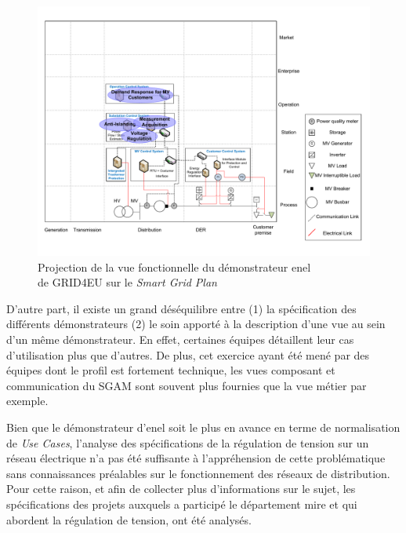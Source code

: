\begin{figure}[!ht]
    \begin{center}
     \includegraphics[trim=0cm 1cm 0cm 1cm, width=1\textwidth, clip]{figures/4_demarche/enel.pdf}
    \end{center}
    \caption{Projection de la vue fonctionnelle du démonstrateur \gls{enel} \\
    de GRID4EU sur le \textit{Smart Grid Plan}} \label{fig:enel_sgplan}
\end{figure}

D'autre part, il existe un grand déséquilibre entre (1) la spécification des
différents démonstrateurs (2) le soin apporté à la description d'une vue au sein
d'un même démonstrateur. En effet, certaines équipes détaillent leur cas
d'utilisation plus que d'autres.
De plus, cet exercice ayant été mené par des équipes dont le profil est
fortement technique, les vues composant et communication du SGAM sont souvent
plus fournies que la vue métier par exemple.

Bien que le démonstrateur d'\gls{enel} soit le plus en avance en terme de
normalisation de \textit{Use Cases}, l'analyse des spécifications de la
régulation de tension sur un réseau électrique n'a pas été suffisante à
l'appréhension de cette problématique sans connaissances préalables sur le
fonctionnement des réseaux de distribution. Pour cette raison, et afin de
collecter plus d'informations sur le sujet, les spécifications des projets
auxquels a participé le département \gls{mire} et qui abordent la régulation de
tension, ont été analysés.


